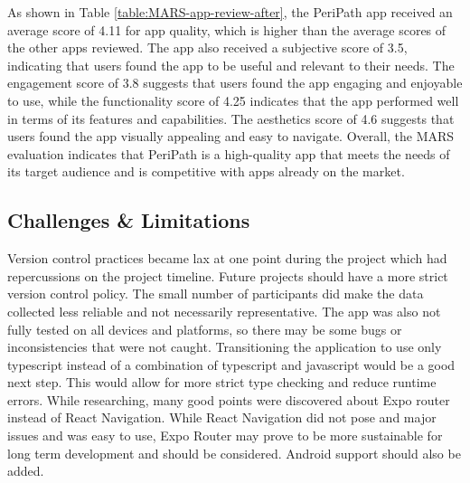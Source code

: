 As shown in Table \ref{table:MARS-app-review-after}, the PeriPath app received an average score of 4.11 for app quality, which is higher than the average scores of the other apps reviewed. The app also received a subjective score of 3.5, indicating that users found the app to be useful and relevant to their needs. The engagement score of 3.8 suggests that users found the app engaging and enjoyable to use, while the functionality score of 4.25 indicates that the app performed well in terms of its features and capabilities. The aesthetics score of 4.6 suggests that users found the app visually appealing and easy to navigate. Overall, the MARS evaluation indicates that PeriPath is a high-quality app that meets the needs of its target audience and is competitive with apps already on the market.

\subsection{Challenges \& Limitations}
Version control practices became lax at one point during the project which had repercussions on the project timeline. Future projects should have a more strict version control policy. The small number of participants did make the data collected less reliable and not necessarily representative. The app was also not fully tested on all devices and platforms, so there may be some bugs or inconsistencies that were not caught. Transitioning the application to use only typescript instead of a combination of typescript and javascript would be a good next step. This would allow for more strict type checking and reduce runtime errors. While researching, many good points were discovered about Expo router instead of React Navigation. While React Navigation did not pose and major issues and was easy to use, Expo Router may prove to be more sustainable for long term development and should be considered. Android support should also be added.

